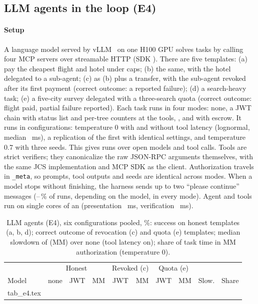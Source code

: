 \subsection{LLM agents in the loop (E4)}\label{sec:e4}
\paragraph*{Setup} A language model served by vLLM~\EFourVllm{} on one H100 GPU solves \EFourTasks{} tasks by calling four MCP servers over streamable HTTP (SDK \EFourSdk{}). There are five templates: (a) pay the cheapest flight and hotel under caps; (b) the same, with the hotel delegated to a sub-agent; (c) as (b) plus a transfer, with the sub-agent revoked after its first payment (correct outcome: a reported failure); (d) a search-heavy task; (e) a five-city survey delegated with a three-search quota (correct outcome: flight paid, partial failure reported).
Each task runs in four modes: none, a JWT chain with status list and per-tree counters at the tools, \sys{}, and \sys{} with escrow. It runs in \EFourCfgs{} configurations: temperature 0 with and without tool latency (lognormal, median \EFourLatMed{}~ms), a replication of the first with identical settings, and temperature 0.7 with three seeds. This gives \EFourRuns{} runs over \EFourModels{} open models and \EFourCalls{} tool calls. Tools are strict verifiers; they canonicalize the raw JSON-RPC arguments themselves, with the same JCS implementation and MCP SDK as the client. Authorization travels in \texttt{\_meta}, so prompts, tool outputs and seeds are identical across modes. When a model stops without finishing, the harness sends up to two ``please continue'' messages (\EFourNudgeMin{}--\EFourNudgeMax{}\,\% of runs, depending on the model, in every mode). Agent and tools run on single cores of an \EFourCpu{} (presentation \EFourPresMs{}~ms, verification \EFourVerMs{}~ms).

\begin{table}[t]\centering\caption{LLM agents (E4), six configurations pooled, \%: success on honest templates (a, b, d); correct outcome of revocation (c) and quota (e) templates; median slowdown of \sys{} (MM) over none (tool latency on); share of task time in MM authorization (temperature 0).}\label{tab:e4}
\scriptsize\setlength{\tabcolsep}{1.8pt}
\begin{tabular}{@{}lrrrrrrrrr@{}}\toprule & \multicolumn{3}{c}{Honest} & \multicolumn{2}{c}{Revoked (c)} & \multicolumn{2}{c}{Quota (e)} & & \\ Model & none & JWT & MM & JWT & MM & JWT & MM & Slow. & Share\\\midrule
{} tab_e4.tex \end{tabular}\end{table}

